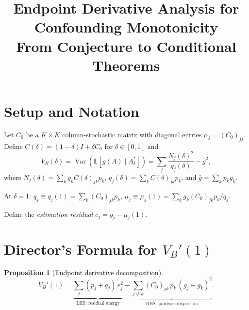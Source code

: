 \documentclass[11pt]{article}
\title{Endpoint Derivative Analysis for Confounding Monotonicity\\
{\large From Conjecture to Conditional Theorems}}
\date{}
\newtheorem{proposition}[theorem]{Proposition}
\DeclareMathOperator{\Var}{Var}
\begin{document}
\maketitle

\section{Setup and Notation}

Let $C_0$ be a $K\times K$ column-stochastic matrix with diagonal entries $\alpha_j = (C_0)_{jj}$.
Define $C(\delta) = (1-\delta)I + \delta C_0$ for $\delta \in [0,1]$ and
\[
  V_B(\delta) = \Var(\mathbb{E}[g(A) \mid A^*_\delta]) = \sum_j \frac{N_j(\delta)^2}{q_j(\delta)} - \bar{g}^2,
\]
where $N_j(\delta) = \sum_k g_k C(\delta)_{jk} p_k$, $q_j(\delta) = \sum_k C(\delta)_{jk} p_k$, and $\bar{g} = \sum_k p_k g_k$.

At $\delta=1$: $q_j \equiv q_j(1) = \sum_k (C_0)_{jk} p_k$, $\mu_j \equiv \mu_j(1) = \sum_k g_k (C_0)_{jk} p_k / q_j$.

Define the \emph{estimation residual} $e_j = g_j - \mu_j(1)$.

\section{Director's Formula for $V_B'(1)$}

\begin{proposition}[Endpoint derivative decomposition]
\label{prop:endpoint}
\begin{equation}
  V_B'(1) = \underbrace{\sum_j (p_j + q_j)\,e_j^2}_{\text{LHS: residual energy}}
           - \underbrace{\sum_{j \neq k} (C_0)_{jk}\,p_k\,(g_j - g_k)^2}_{\text{RHS: pairwise dispersion}}.
  \label{eq:director}
\end{equation}
\end{proposition}
\end{document}
